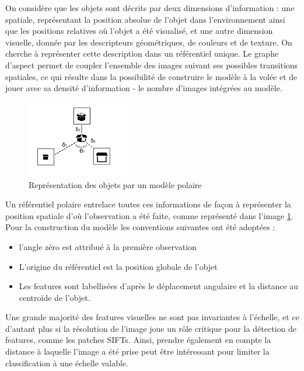 On considère que les objets sont décrits par deux dimensions
d'information : une spatiale, représentant la position absolue de l'objet
dans l'environnement ainsi que les positions relatives où l'objet a été
visualisé, et une autre dimension visuelle, donnée par les descripteurs
géométriques, de couleurs et de texture. On cherche à représenter cette description dans un référentiel unique. Le graphe d'aspect permet de coupler
l'ensemble des images suivant ses possibles transitions spatiales, ce qui
résulte dans la possibilité de construire le modèle à la volée et de
jouer avec sa densité d'information - le nombre d'images intégrées au modèle.

\begin{figure}[H]
  \centering
  \includegraphics[width=0.4\textwidth]{object_model.png}
  \caption{Représentation des objets par un modèle polaire}
	\label{fig:graphe_polaire}
\end{figure}

Un référentiel polaire entrelace toutes ces informations
de façon à représenter la position spatiale d'où l'observation a été
faite, comme représenté dans l'image \ref{fig:graphe_polaire}. Pour la
construction du modèle les conventions suivantes ont été adoptées :
\begin{itemize}
\item l'angle zéro est attribué à la première observation
\item L'origine du référentiel est la position globale de l’objet
\item Les features sont labellisées d'après le déplacement angulaire
  et la distance au centroïde de l'objet.
\end{itemize}

Une grande majorité des features visuelles ne sont pas invariantes à l'échelle, et ce d'autant plus si la résolution de l’image joue un rôle critique pour la
détection de features, comme les patches SIFTs. Ainsi, prendre également en compte la distance à laquelle l’image a été prise peut être intéressant pour limiter la
classification à une échelle valable.